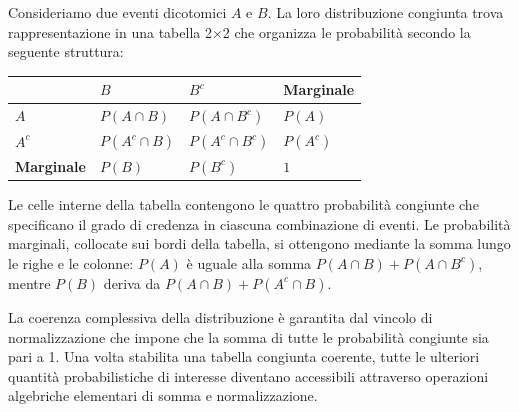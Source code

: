 \documentclass[
  letterpaper,
  DIV=11,
  numbers=noendperiod,
  oneside]{scrreprt}
\theoremstyle{definition}
\theoremstyle{plain}
\theoremstyle{definition}
\theoremstyle{remark}
\begin{document}
Consideriamo due eventi dicotomici \(A\) e \(B\). La loro distribuzione
congiunta trova rappresentazione in una tabella 2×2 che organizza le
probabilità secondo la seguente struttura:

\begin{longtable}[]{@{}llll@{}}
\toprule\noalign{}
& \(B\) & \(B^c\) & Marginale \\
\midrule\noalign{}
\endhead
\bottomrule\noalign{}
\endlastfoot
\(A\) & \(P(A \cap B)\) & \(P(A \cap B^c)\) & \(P(A)\) \\
\(A^c\) & \(P(A^c \cap B)\) & \(P(A^c \cap B^c)\) & \(P(A^c)\) \\
\textbf{Marginale} & \(P(B)\) & \(P(B^c)\) & \(1\) \\
\end{longtable}

Le celle interne della tabella contengono le quattro probabilità
congiunte che specificano il grado di credenza in ciascuna combinazione
di eventi. Le probabilità marginali, collocate sui bordi della tabella,
si ottengono mediante la somma lungo le righe e le colonne: \(P(A)\) è
uguale alla somma \(P(A\cap B) + P(A\cap B^c)\), mentre \(P(B)\) deriva
da \(P(A\cap B) + P(A^c\cap B)\).

La coerenza complessiva della distribuzione è garantita dal vincolo di
normalizzazione che impone che la somma di tutte le probabilità
congiunte sia pari a 1. Una volta stabilita una tabella congiunta
coerente, tutte le ulteriori quantità probabilistiche di interesse
diventano accessibili attraverso operazioni algebriche elementari di
somma e normalizzazione.
\end{document}
